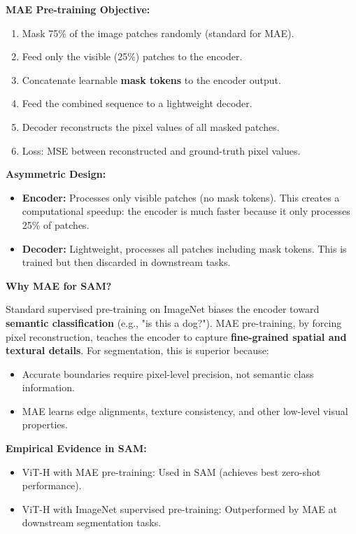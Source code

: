 \textbf{MAE Pre-training Objective:}

\begin{enumerate}
    \item Mask 75\% of the image patches randomly (standard for MAE).
    \item Feed only the visible (25\%) patches to the encoder.
    \item Concatenate learnable \textbf{mask tokens} to the encoder output.
    \item Feed the combined sequence to a lightweight decoder.
    \item Decoder reconstructs the pixel values of all masked patches.
    \item Loss: MSE between reconstructed and ground-truth pixel values.
\end{enumerate}

\textbf{Asymmetric Design:}

\begin{itemize}
    \item \textbf{Encoder:} Processes only visible patches (no mask tokens). This creates a computational speedup: the encoder is much faster because it only processes 25\% of patches.
    \item \textbf{Decoder:} Lightweight, processes all patches including mask tokens. This is trained but then discarded in downstream tasks.
\end{itemize}

\textbf{Why MAE for SAM?}

Standard supervised pre-training on ImageNet biases the encoder toward \textbf{semantic classification} (e.g., "is this a dog?"). MAE pre-training, by forcing pixel reconstruction, teaches the encoder to capture \textbf{fine-grained spatial and textural details}. For segmentation, this is superior because:
\begin{itemize}
    \item Accurate boundaries require pixel-level precision, not semantic class information.
    \item MAE learns edge alignments, texture consistency, and other low-level visual properties.
\end{itemize}

\textbf{Empirical Evidence in SAM:}
\begin{itemize}
    \item ViT-H with MAE pre-training: Used in SAM (achieves best zero-shot performance).
    \item ViT-H with ImageNet supervised pre-training: Outperformed by MAE at downstream segmentation tasks.
\end{itemize}

